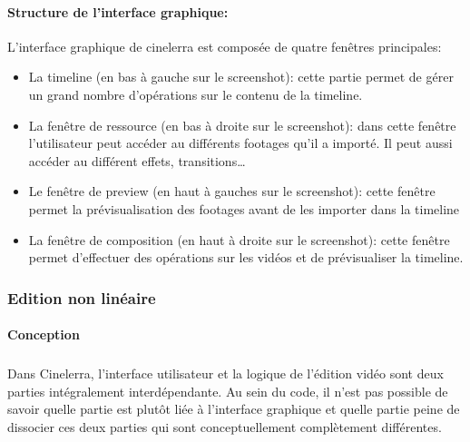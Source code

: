 \paragraph{Structure de l'interface graphique:}

L'interface graphique de cinelerra est composée de quatre fenêtres
principales:

\begin{itemize}
  \item {La timeline (en bas à gauche sur le screenshot): cette
    partie permet de gérer un grand nombre d'opérations sur le contenu de
    la timeline.}

  \item {La fenêtre de ressource (en bas à droite sur le screenshot):
    dans cette fenêtre l'utilisateur peut accéder au différents
    footages qu'il a importé. Il peut aussi accéder au différent effets,
    transitions\ldots}

  \item {Le fenêtre de preview (en haut à gauches sur le screenshot):
    cette fenêtre permet la prévisualisation des footages avant de les
    importer dans la timeline}

  \item {La fenêtre de composition (en haut à droite sur le screenshot):
    cette fenêtre permet d'effectuer des opérations sur les vidéos et
    de prévisualiser la timeline.}

\end{itemize}

\subsubsection{Edition non linéaire}

\paragraph{Conception}

\subparagraph{}

Dans Cinelerra, l'interface utilisateur et la logique de l'édition
vidéo sont deux parties intégralement interdépendante. Au sein du
code, il n'est pas possible de savoir quelle partie est plutôt liée à
l'interface graphique et quelle partie %
peine de dissocier ces deux parties qui sont conceptuellement complètement
différentes. %

